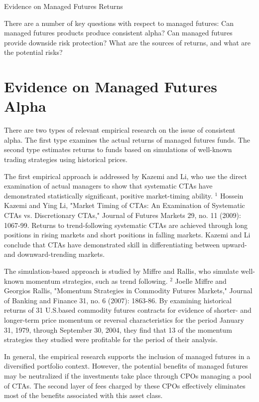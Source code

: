\documentclass[11pt]{article}
\begin{document}
Evidence on Managed Futures Returns

There are a number of key questions with respect to managed futures: Can managed futures products produce consistent alpha? Can managed futures provide downside risk protection? What are the sources of returns, and what are the potential risks?

\section*{Evidence on Managed Futures Alpha}
There are two types of relevant empirical research on the issue of consistent alpha. The first type examines the actual returns of managed futures funds. The second type estimates returns to funds based on simulations of well-known trading strategies using historical prices.

The first empirical approach is addressed by Kazemi and Li, who use the direct examination of actual managers to show that systematic CTAs have demonstrated statistically significant, positive market-timing ability. ${ }^{1}$ Hossein Kazemi and Ying Li, "Market Timing of CTAs: An Examination of Systematic CTAs vs. Discretionary CTAs," Journal of Futures Markets 29, no. 11 (2009): 1067-99. Returns to trend-following systematic CTAs are achieved through long positions in rising markets and short positions in falling markets. Kazemi and Li conclude that CTAs have demonstrated skill in differentiating between upward- and downward-trending markets.

The simulation-based approach is studied by Miffre and Rallis, who simulate well-known momentum strategies, such as trend following. ${ }^{2}$ Joelle Miffre and Georgios Rallis, "Momentum Strategies in Commodity Futures Markets," Journal of Banking and Finance 31, no. 6 (2007): 1863-86. By examining historical returns of 31 U.S.based commodity futures contracts for evidence of shorter- and longer-term price momentum or reversal characteristics for the period January 31, 1979, through September 30, 2004, they find that 13 of the momentum strategies they studied were profitable for the period of their analysis.

In general, the empirical research supports the inclusion of managed futures in a diversified portfolio context. However, the potential benefits of managed futures may be neutralized if the investments take place through CPOs managing a pool of CTAs. The second layer of fees charged by these CPOs effectively eliminates most of the benefits associated with this asset class.
\end{document}
